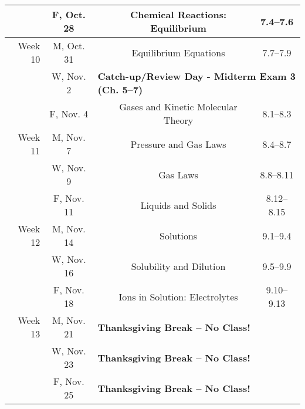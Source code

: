 \documentclass[12pt, letterpaper]{article}
\begin{document}
\begin{tabular}{rcccc}
	       & F, Oct. 28 &                                                                              & Chemical Reactions: Equilibrium                     & 7.4--7.6   \\
	\midrule
	Week 10     & M, Oct. 31 &                                                                                  & Equilibrium Equations              & 7.7--7.9     \\
	            & W, Nov. 2  & \multicolumn{3}{l}{\textbf{Catch-up/Review Day - Midterm Exam 3 (Ch. 5--7)}}                                                         \\
	            & F, Nov. 4  &                                                                                  & Gases and Kinetic Molecular Theory & 8.1--8.3     \\
	\midrule
	Week 11     & M, Nov. 7  &                                                                                  & Pressure and Gas Laws              & 8.4--8.7     \\
	            & W, Nov. 9  &                                                                                  & Gas Laws                           & 8.8--8.11    \\
	            & F, Nov. 11 &                                                                                  & Liquids and Solids                 & 8.12--8.15   \\
	\midrule
	Week 12     & M, Nov. 14 &                                                                                  & Solutions                          & 9.1--9.4     \\
	            & W, Nov. 16 &                                                                                  & Solubility and Dilution            & 9.5--9.9     \\
	            & F, Nov. 18 &                                                                                  & Ions in Solution: Electrolytes     & 9.10--9.13   \\
	\midrule
	Week 13     & M, Nov. 21 & \multicolumn{3}{l}{\textbf{Thanksgiving Break -- No Class!}}                                                                         \\
	            & W, Nov. 23 & \multicolumn{3}{l}{\textbf{Thanksgiving Break -- No Class!}}                                                                         \\
	            & F, Nov. 25 & \multicolumn{3}{l}{\textbf{Thanksgiving Break -- No Class!}}                                                                         \\
\end{tabular}
\end{document}
